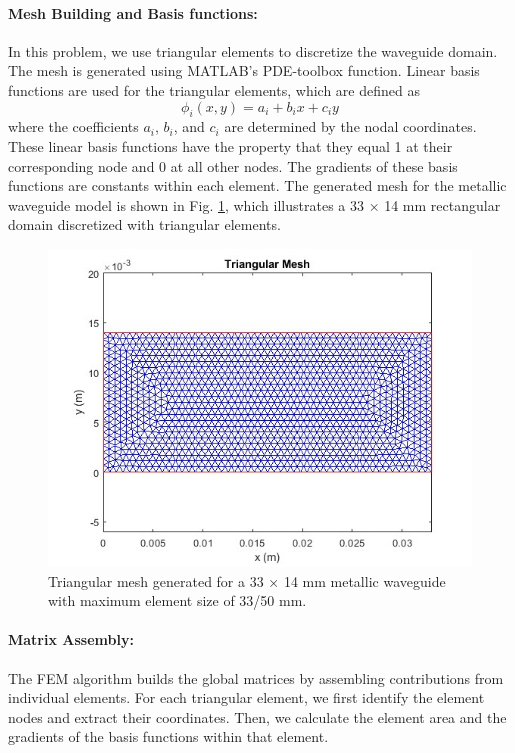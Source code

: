 \documentclass[10pt,letterpaper]{article}
\begin{document}
\paragraph{Mesh Building and Basis functions:}  
In this problem, we use triangular elements to discretize the waveguide domain. 
The mesh is generated using MATLAB's PDE-toolbox function. Linear basis functions
are used for the triangular elements, which are defined as
\begin{equation}
\phi_i(x,y) = a_i + b_i x + c_i y
\end{equation}
where the coefficients $a_i$, $b_i$, and $c_i$ are determined by the nodal coordinates. These linear basis functions have the property that they equal 1 at their corresponding node and 0 at all other nodes. The gradients of these basis functions are constants within each element.
The generated mesh for the metallic waveguide model is shown in Fig. \ref{fig:mesh}, which illustrates a 33 × 14 mm rectangular domain discretized with triangular elements. 
\begin{figure}[htbp]
    \centering
    \includegraphics[width=0.8\linewidth]{mesh1.jpg}
    \caption{Triangular mesh generated for a 33 × 14 mm metallic waveguide with maximum element size of 33/50 mm.}
    \label{fig:mesh}
\end{figure}

\paragraph{Matrix Assembly:}  
The FEM algorithm builds the global matrices by assembling contributions from individual elements. For each triangular element, we first identify the element nodes and extract their coordinates. Then, we calculate the element area and the gradients of the basis functions within that element.
\end{document}
